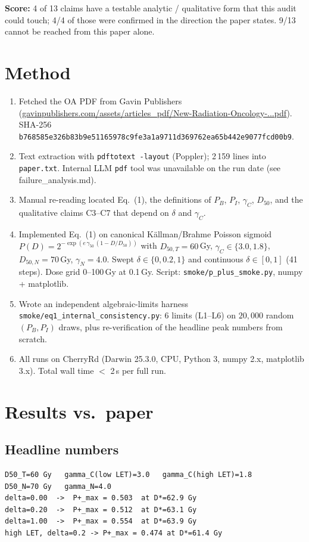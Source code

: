 \documentclass[11pt]{article}
\begin{document}
\textbf{Score:} 4 of 13 claims have a testable analytic / qualitative
form that this audit could touch; 4/4 of those were confirmed in the
direction the paper states. 9/13 cannot be reached from this paper alone.

\section{Method}
\begin{enumerate}
\item Fetched the OA PDF from Gavin Publishers
      (\url{gavinpublishers.com/assets/articles_pdf/New-Radiation-Oncology-...pdf}).
      SHA-256 \texttt{b768585e326b83b9e51165978c9fe3a1a9711d369762ea65b442e9077fcd00b9}.
\item Text extraction with \texttt{pdftotext -layout} (Poppler); 2\,159 lines
      into \texttt{paper.txt}. Internal LLM \texttt{pdf} tool was
      unavailable on the run date (see failure\_analysis.md).
\item Manual re-reading located Eq.~(1), the definitions of $P_B$, $P_I$,
      $\gamma_C$, $D_{50}$, and the qualitative claims C3--C7 that
      depend on $\delta$ and $\gamma_C$.
\item Implemented Eq.~(1) on canonical K\"allman/Brahme Poisson sigmoid
      $P(D) = 2^{-\exp(e\,\gamma_{50}\,(1-D/D_{50}))}$
      with $D_{50,T}=60$\,Gy, $\gamma_C\in\{3.0,1.8\}$, $D_{50,N}=70$\,Gy,
      $\gamma_N=4.0$. Swept $\delta\in\{0,0.2,1\}$ and continuous
      $\delta\in[0,1]$ (41 steps). Dose grid 0--100\,Gy at 0.1\,Gy.
      Script: \texttt{smoke/p\_plus\_smoke.py}, numpy + matplotlib.
\item Wrote an independent algebraic-limits harness
      \texttt{smoke/eq1\_internal\_consistency.py}: 6 limits (L1--L6)
      on $20{,}000$ random $(P_B, P_I)$ draws, plus re-verification of
      the headline peak numbers from scratch.
\item All runs on CherryRd (Darwin 25.3.0, CPU, Python 3, numpy
      2.x, matplotlib 3.x). Total wall time $<$ 2\,s per full run.
\end{enumerate}

\section{Results vs.\ paper}
\subsection{Headline numbers}
\begin{lstlisting}
D50_T=60 Gy   gamma_C(low LET)=3.0   gamma_C(high LET)=1.8
D50_N=70 Gy   gamma_N=4.0
delta=0.00  ->  P+_max = 0.503  at D*=62.9 Gy
delta=0.20  ->  P+_max = 0.512  at D*=63.1 Gy
delta=1.00  ->  P+_max = 0.554  at D*=63.9 Gy
high LET, delta=0.2 -> P+_max = 0.474 at D*=61.4 Gy
\end{lstlisting}
\end{document}
